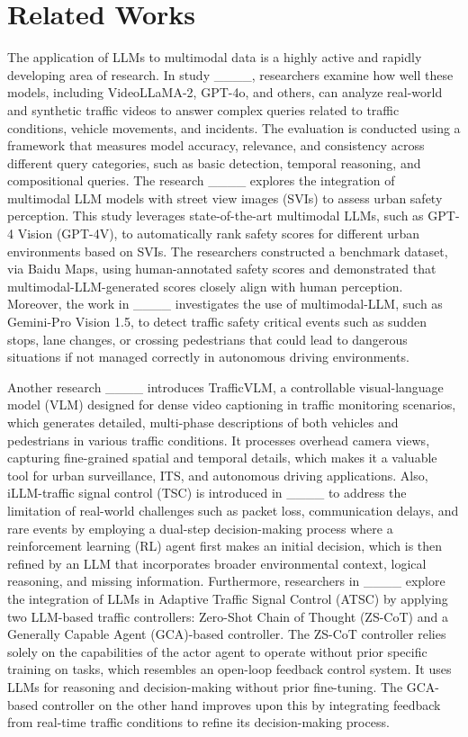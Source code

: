 \section{Related Works}
\label{sec:2}

The application of LLMs to multimodal data is a highly active and rapidly developing area of research. In study ____, researchers examine how well these models, including VideoLLaMA-2, GPT-4o, and others, can analyze real-world and synthetic traffic videos to answer complex queries related to traffic conditions, vehicle movements, and incidents. The evaluation is conducted using a framework that measures model accuracy, relevance, and consistency across different query categories, such as basic detection, temporal reasoning, and compositional queries. The research ____ explores the integration of multimodal LLM models with street view images (SVIs) to assess urban safety perception. This study leverages state-of-the-art multimodal LLMs, such as GPT-4 Vision (GPT-4V), to automatically rank safety scores for different urban environments based on SVIs. The researchers constructed a benchmark dataset, via Baidu Maps, using human-annotated safety scores and demonstrated that multimodal-LLM-generated scores closely align with human perception. Moreover, the work in ____ investigates the use of multimodal-LLM, such as Gemini-Pro Vision 1.5, to detect traffic safety critical events such as sudden stops, lane changes, or crossing pedestrians that could lead to dangerous situations if not managed correctly in autonomous driving environments. 

Another research ____ introduces TrafficVLM, a controllable visual-language model (VLM) designed for dense video captioning in traffic monitoring scenarios, which generates detailed, multi-phase descriptions of both vehicles and pedestrians in various traffic conditions. It processes overhead camera views, capturing fine-grained spatial and temporal details, which makes it a valuable tool for urban surveillance, ITS, and autonomous driving applications. Also, iLLM-traffic signal control (TSC) is introduced in ____ to address the limitation of real-world challenges such as packet loss, communication delays, and rare events by employing a dual-step decision-making process where a reinforcement learning (RL) agent first makes an initial decision, which is then refined by an LLM that incorporates broader environmental context, logical reasoning, and missing information. Furthermore, researchers in ____ explore the integration of LLMs in Adaptive Traffic Signal Control (ATSC) by applying two LLM-based traffic controllers: Zero-Shot Chain of Thought (ZS-CoT) and a Generally Capable Agent (GCA)-based controller. The ZS-CoT controller relies solely on the capabilities of the actor agent to operate without prior specific training on tasks, which resembles an open-loop feedback control system. It uses LLMs for reasoning and decision-making without prior fine-tuning. The GCA-based controller on the other hand improves upon this by integrating feedback from real-time traffic conditions to refine its decision-making process. 



